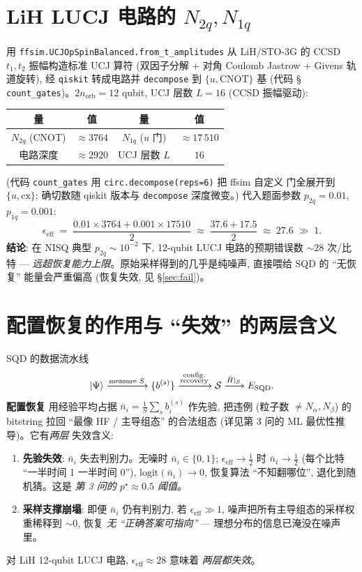 \documentclass[11pt]{article}
\begin{document}
\section{LiH LUCJ 电路的 $N_{2q},N_{1q}$}
用 \texttt{ffsim.UCJOpSpinBalanced.from\_t\_amplitudes} 从 LiH/STO-3G 的 CCSD
$t_1,t_2$ 振幅构造标准 UCJ 算符 (双因子分解 + 对角 Coulomb Jastrow + Givens 轨道旋转),
经 \texttt{qiskit} 转成电路并 \texttt{decompose} 到 $\{u,\text{CNOT}\}$ 基 (代码 \S
\texttt{count\_gates})。$2n_{\text{orb}}=12$ qubit, UCJ 层数 $L=16$ (CCSD 振幅驱动):
\begin{center}
\begin{tabular}{c|ccc}
量 & 值 & 量 & 值 \\
\hline
$N_{2q}$ (CNOT) & $\approx 3764$ & $N_{1q}$ ($u$ 门) & $\approx 17\,510$ \\
电路深度 & $\approx 2920$ & UCJ 层数 $L$ & $16$
\end{tabular}
\end{center}
(代码 \texttt{count\_gates} 用 \texttt{circ.decompose(reps=6)} 把 ffsim 自定义
门全展开到 $\{u,\text{cx}\}$; 确切数随 qiskit 版本与 \texttt{decompose} 深度微变。)
代入题面参数 $p_{2q}{=}0.01$, $p_{1q}{=}0.001$:
\[
  \epsilon_{\text{eff}}\;=\;\frac{0.01\times3764+0.001\times17510}{2}
                       \;\approx\;\frac{37.6+17.5}{2}\;\approx\;27.6\;\gg\;1.
\]
\textbf{结论}: 在 NISQ 典型 $p_{2q}{\sim}10^{-2}$ 下, 12-qubit LUCJ 电路的预期错误数
$\sim 28$ 次/比特 --- \emph{远超恢复能力上限}。原始采样得到的几乎是纯噪声, 直接喂给
SQD 的 ``无恢复'' 能量会严重偏高 (恢复失效, 见 \S\ref{sec:fail})。

\section{配置恢复的作用与 ``失效'' 的两层含义}
\label{sec:recover}
SQD 的数据流水线
\[
  \ket{\Psi}\xrightarrow{\text{measure }S}\{b^{(s)}\}
  \xrightarrow{\substack{\text{config.}\\\text{recovery}}}
  \mathcal{S}\xrightarrow{\hat H|_{\mathcal{S}}}E_{\text{SQD}}.
\]
\textbf{配置恢复} 用经验平均占据 $\bar n_i=\tfrac1S\sum_s b_i^{(s)}$ 作先验, 把违例
(粒子数 $\ne N_\alpha,N_\beta$) 的 bitstring 拉回 ``最像 HF / 主导组态'' 的合法组态
(详见第 3 问的 ML 最优性推导)。它有\emph{两层} 失效含义:

\begin{enumerate}
  \item \textbf{先验失效}: $\bar n_i$ 失去判别力。无噪时 $\bar n_i\in\{0,1\}$;
        $\epsilon_{\text{eff}}\to\tfrac12$ 时 $\bar n_i\to\tfrac12$ (每个比特
        ``一半时间 1 一半时间 0''), $\mathrm{logit}(\bar n_i)\to0$, 恢复算法
        ``不知翻哪位'', 退化到随机猜。这是 \emph{第 3 问的 $p^\star\approx0.5$ 阈值}。
  \item \textbf{采样支撑崩塌}: 即便 $\bar n_i$ 仍有判别力, 若 $\epsilon_{\text{eff}}\gg1$,
        噪声把所有主导组态的采样权重稀释到 $\sim 0$, 恢复 \emph{无 ``正确答案可指向''} ---
        理想分布的信息已淹没在噪声里。
\end{enumerate}
对 LiH 12-qubit LUCJ 电路, $\epsilon_{\text{eff}}\approx28$ 意味着 \emph{两层都失效}。
\end{document}

